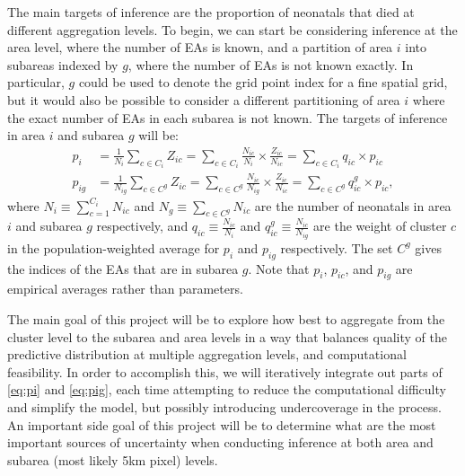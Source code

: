 \documentclass[12pt]{article}
\begin{document}
The main targets of inference are the proportion of neonatals that died at different aggregation levels.  To begin, we can start be considering inference at the area level, where the number of EAs is known, and a partition of area $i$ into subareas indexed by $g$, where the number of EAs is not known exactly.  In particular, $g$ could be used to denote the grid point index for a fine spatial grid, but it would also be possible to consider a different partitioning of area $i$ where the exact number of EAs in each subarea is not known.  The targets of inference in area $i$ and subarea $g$ will be: 
\begin{align}
p_i &= \frac{1}{N_i}\sum_{c \in C_i} Z_{ic} = \sum_{c \in C_i} \frac{N_{ic}}{N_i}  \times \frac{Z_{ic}}{N_{ic}}  =  \sum_{c \in C_i} q_{ic} \times p_{ic} \label{eq:pi} \\
p_{ig} &= \frac{1}{N_{ig}} \sum_{c \in C^g} Z_{ic} = \sum_{c \in C^g} \frac{N_{ic}}{N_{ig}}  \times \frac{Z_{ic}}{N_{ic}}  =  \sum_{c \in C^g} q_{ic}^g \times p_{ic}, \label{eq:pig}
\end{align}
where $N_i \equiv \sum_{c=1}^{C_i} N_{ic}$ and $N_{g} \equiv \sum_{c \in C^g} N_{ic}$ are the number of neonatals in area $i$ and subarea $g$ respectively, and $q_{ic} \equiv \frac{N_{ic}}{N_i}$ and $q_{ic}^g \equiv \frac{N_{ic}}{N_{ig}}$ are the weight of cluster $c$ in the population-weighted average for $p_i$ and $p_{ig}$ respectively. The set $C^g$ gives the indices of the EAs that are in subarea $g$. Note that $p_i$, $p_{ic}$, and $p_{ig}$ are empirical averages rather than parameters.

The main goal of this project will be to explore how best to aggregate from the cluster level to the subarea and area levels in a way that balances quality of the predictive distribution at multiple aggregation levels, and computational feasibility. In order to accomplish this, we will iteratively integrate out parts of \eqref{eq:pi} and \eqref{eq:pig}, each time attempting to reduce the computational difficulty and simplify the model, but possibly introducing undercoverage in the process. An important side goal of this project will be to determine what are the most important sources of uncertainty when conducting inference at both area and subarea (most likely 5km pixel) levels.
\end{document}
